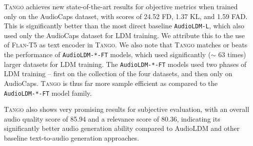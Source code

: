 \documentclass{article}
\newcommand{\model}{\textsc{Tango}}
\begin{document}
\model{} achieves new state-of-the-art results for objective metrics when trained only on the AudioCaps dataset, with scores of 24.52 FD, 1.37 KL, and 1.59 FAD. This is significantly better than the most direct baseline \texttt{AudioLDM-L}, which also used only the AudioCaps dataset for LDM training. We attribute this to the use of \textsc{Flan-T5} as text encoder in \model{}. We also note that \model{} matches or beats the performance of \texttt{AudioLDM-*-FT} models, which used significantly ($\sim$ 63 times) larger datasets for LDM training. The \texttt{AudioLDM-*-FT} models used two phases of LDM training -- first on the collection of the four datasets, and then only on AudioCaps. \model{} is thus far more sample efficient as compared to the \texttt{AudioLDM-*-FT} model family.

\model{} also shows very promising results for subjective evaluation, with an overall audio quality score of 85.94 and a relevance score of 80.36, indicating its significantly better audio generation ability compared to AudioLDM and other baseline text-to-audio generation approaches. 
\end{document}
